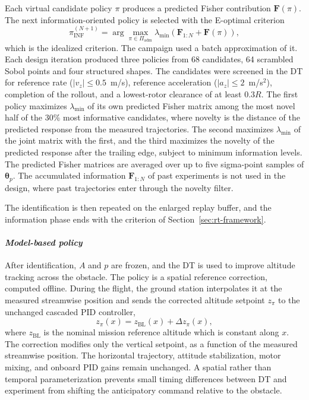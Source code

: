 \documentclass[journal]{IEEEtran}
\begin{document}
Each virtual candidate policy $\pi$ produces a predicted Fisher contribution $\mathbf F(\pi)$. The next information-oriented policy is selected with the E-optimal criterion
\begin{equation}
 \pi_{\mathrm{INF}}^{(N+1)}=
 \arg\max_{\pi\in\Pi_{\mathrm{adm}}}
 \lambda_{\min}\!\left(
 \mathbf F_{1:N}+\mathbf F(\pi)
 \right),
 \label{eq:e-optimal-design}
\end{equation}
which is the idealized criterion. The campaign used a batch approximation of it. Each design iteration produced three policies from 68 candidates, 64 scrambled Sobol points and four structured shapes. The candidates were screened in the DT for reference rate ($|v_z|\leq0.5$~m/s), reference acceleration ($|a_z|\leq2$~m/s$^2$), completion of the rollout, and a lowest-rotor clearance of at least $0.3R$. The first policy maximizes $\lambda_{\min}$ of its own predicted Fisher matrix among the most novel half of the $30\%$ most informative candidates, where novelty is the distance of the predicted response from the measured trajectories. The second maximizes $\lambda_{\min}$ of the joint matrix with the first, and the third maximizes the novelty of the predicted response after the trailing edge, subject to minimum information levels. The predicted Fisher matrices are averaged over up to five sigma-point samples of $\boldsymbol{\theta}_p$. The accumulated information $\mathbf F_{1:N}$ of past experiments is not used in the design, where past trajectories enter through the novelty filter.

The identification is then repeated on the enlarged replay buffer, and the information phase ends with the criterion of Section~\ref{sec:rt-framework}.

\paragraph*{\textit{Model-based policy}}
\label{sec:mb-optimum}
After identification, $A$ and $p$ are frozen, and the DT is used to improve altitude tracking across the obstacle. The policy is a spatial reference correction, computed offline. During the flight, the ground station interpolates it at the measured streamwise position and sends the corrected altitude setpoint $z_{\pi}$ to the unchanged cascaded PID controller,
\begin{equation}
 z_{\pi}(x)=z_{\mathrm{BL}}(x)+\Delta z_{\pi}(x),
 \label{eq:policy}
\end{equation}
where $z_{\mathrm{BL}}$ is the nominal mission reference altitude which is constant along $x$. The correction modifies only the vertical setpoint, as a function of the measured streamwise position. The horizontal trajectory, attitude stabilization, motor mixing, and onboard PID gains remain unchanged. A spatial rather than temporal parameterization prevents small timing differences between DT and experiment from shifting the anticipatory command relative to the obstacle.
\end{document}
